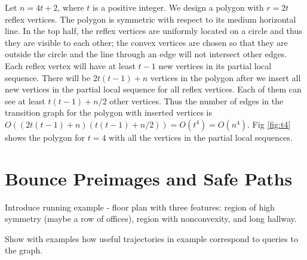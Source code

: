 \documentclass[]{svproc}  %
\begin{document}
Let $n = 4t+2$, where $t$ is a positive integer. We design a polygon with
$r = 2t$ reflex vertices. The polygon is symmetric with respect to its medium
horizontal line. In the top half, the reflex vertices are uniformly located on a
circle and thus they are visible to each other; the convex vertices are chosen
so that they are outside the circle and the line through an edge will not
intersect other edges. Each reflex vertex will have at least $t-1$ new
vertices in its partial local sequence. There will be $2t(t-1)+n$
vertices in the polygon after we insert all new vertices in the partial local
sequence for all reflex vertices. Each of them can see at least $t(t-1)+n/2$
other vertices. Thus the number of edges in the transition graph for the
polygon with inserted vertices is
$O ((2t(t-1)+n)(t(t-1)+n/2)) = O(t^4) = O(n^4)$.
Fig \ref{fig:t4} shows the polygon for $t = 4$ with all the
vertices in the partial local sequences. %


%
%

\section{Bounce Preimages and Safe Paths}

{\color{red} Introduce running example - floor plan with three features: region
of high symmetry (maybe a row of offices), region with nonconvexity, and long
hallway.

Show with examples how useful trajectories in example correspond to queries to
the graph.}
\end{document}
